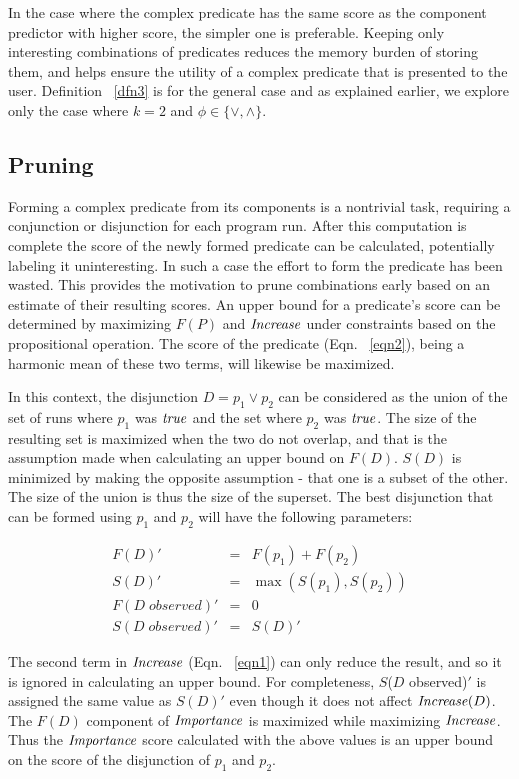In the case where the complex predicate has the same score as the component predictor with higher score, the simpler one is preferable.  Keeping only interesting combinations of predicates reduces the memory burden of storing them, and helps ensure the utility of a complex predicate that is presented to the user.  Definition ~\ref{dfn3} is for the general case and as explained earlier, we explore only the case where $k = 2$ and $\phi \in \{\vee, \wedge\}$.

\subsection{Pruning}
\label{sec-pruning}
Forming a complex predicate from its components is a nontrivial task, requiring a conjunction or disjunction for each program run.  After this computation is complete the score of the newly formed predicate can be calculated, potentially labeling it uninteresting.  In such a case the effort to form the predicate has been wasted.  This provides the motivation to prune combinations early based on an estimate of their resulting scores.  An upper bound for a predicate's score can be determined by maximizing $F(P)$ and $\mathit{Increase}$ under constraints based on the propositional operation.  The score of the predicate (Eqn. ~\ref{eqn2}), being a harmonic mean of these two terms, will likewise be maximized.

In this context, the disjunction $D = p_1 \vee p_2$ can be considered as the union of the set of runs where $p_1$ was $\mathit{true}$ and the set where $p_2$ was $\mathit{true}$.  The size of the resulting set is maximized when the two do not overlap, and that is the assumption made when calculating an upper bound on $F(D)$.  $S(D)$ is minimized by making the opposite assumption - that one is a subset of the other.  The size of the union is thus the size of the superset.  The best disjunction that can be formed using $p_1$ and $p_2$ will have the following parameters:

\begin{eqnarray*}
  F(D)' &=&  F(p_1) + F(p_2) \\
  S(D)' &=&  \max(S(p_1),S(p_2)) \\
  F(D\;observed)' &=& 0 \\
  S(D\;observed)' &=& S(D)'
\end{eqnarray*}

The second term in $\mathit{Increase}$ (Eqn. ~\ref{eqn1}) can only reduce the result, and so it is ignored in calculating an upper bound.  For completeness, $S$($D$ observed)$'$ is assigned the same value as $S(D)'$ even though it does not affect $\mathit{Increase}(D)$.  The $F(D)$ component of $\mathit{Importance}$ is maximized while maximizing $\mathit{Increase}$.  Thus the $\mathit{Importance}$ score calculated with the above values is an upper bound on the score of the disjunction of $p_1$ and $p_2$.

